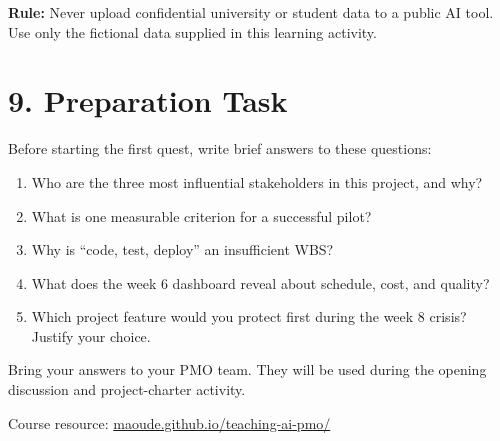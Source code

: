 \documentclass[11pt,a4paper]{article}
\begin{document}
\begin{warningbox}
\textbf{Rule:} Never upload confidential university or student data to a public AI tool. Use only the fictional data supplied in this learning activity.
\end{warningbox}

\section{9. Preparation Task}

Before starting the first quest, write brief answers to these questions:

\begin{enumerate}
  \item Who are the three most influential stakeholders in this project, and why?
  \item What is one measurable criterion for a successful pilot?
  \item Why is ``code, test, deploy'' an insufficient WBS?
  \item What does the week 6 dashboard reveal about schedule, cost, and quality?
  \item Which project feature would you protect first during the week 8 crisis? Justify your choice.
\end{enumerate}

Bring your answers to your PMO team. They will be used during the opening discussion and project-charter activity.

\vfill
\begin{center}
\small\color{pmoTeal}
Course resource: \href{https://maoude.github.io/teaching-ai-pmo/}{maoude.github.io/teaching-ai-pmo/}
\end{center}
\end{document}
